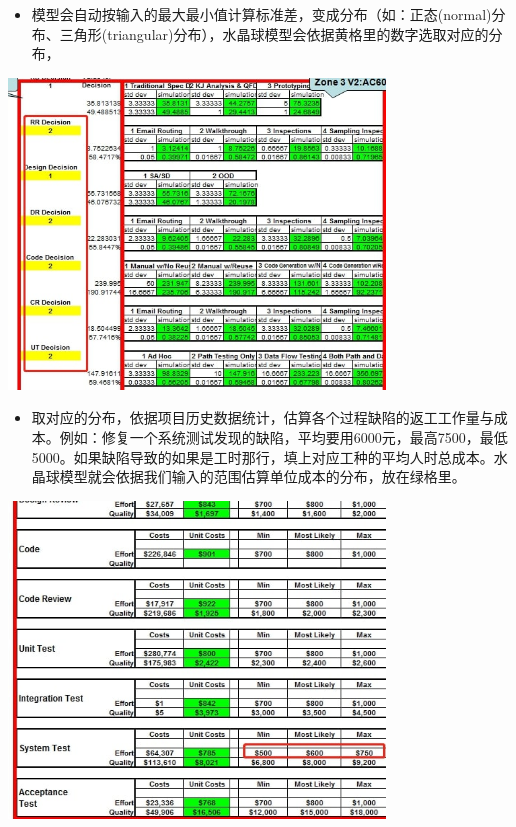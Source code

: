 \begin{itemize}
\tightlist
\item
  模型会自动按输入的最大最小值计算标准差，变成分布（如：正态(normal)分布、三角形(triangular)分布），水晶球模型会依据黄格里的数字选取对应的分布，
\end{itemize}


\includegraphics[width=10cm]{微信截图_20211027011403.jpg}

\begin{itemize}
\tightlist
\item
  取对应的分布，依据项目历史数据统计，估算各个过程缺陷的返工工作量与成本。例如：修复一个系统测试发现的缺陷，平均要用6000元，最高7500，最低5000。如果缺陷导致的如果是工时那行，填上对应工种的平均人时总成本。水晶球模型就会依据我们输入的范围估算单位成本的分布，放在绿格里。
\end{itemize}


\includegraphics[width=10cm]{微信截图_20211027012006.jpg}

